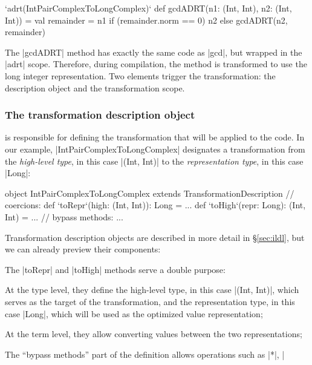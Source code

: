\begin{lstlisting-nobreak}
`adrt(IntPairComplexToLongComplex)` {
  def gcdADRT(n1: (Int, Int), n2: (Int, Int)) = {
    val remainder = n1 %
    if (remainder.norm == 0) n2 else gcdADRT(n2, remainder)
  }
}
\end{lstlisting-nobreak}

The |gcdADRT| method has exactly the same code as |gcd|, but wrapped in the |adrt| scope. Therefore, during compilation, the method is transformed to use the long integer representation. Two elements trigger the transformation: the  description object and the transformation scope.

\subsubsection{The transformation description object} is responsible for defining the transformation that will be applied to the code. In our example, |IntPairComplexToLongComplex| designates a transformation from the \emph{high-level type}, in this case |(Int, Int)| to the \emph{representation type}, in this case |Long|:

\begin{lstlisting-nobreak}
object IntPairComplexToLongComplex
          extends TransformationDescription {
  // coercions:
  def `toRepr`(high: (Int, Int)): Long = ...
  def `toHigh`(repr: Long): (Int, Int) = ...
  // bypass methods:
  ...
}
\end{lstlisting-nobreak}

\noindent
Transformation description objects are described in more detail in \S\ref{sec:ildl}, but we can already preview their components:

\vspace{0.35em}
\begin{compactitem}
  \item The |toRepr| and |toHigh| methods serve a double purpose:
  \begin{compactitem}
    \item At the type level, they define the high-level type, in this case |(Int, Int)|, which serves as the target of the transformation, and the representation type, in this case |Long|, which will be used as the optimized value representation;
    \item At the term level, they allow converting values between the two representations;
  \end{compactitem}
  \item The ``bypass methods'' part of the definition allows operations such as |*|, |%
\end{compactitem}
\vspace{0.35em}

